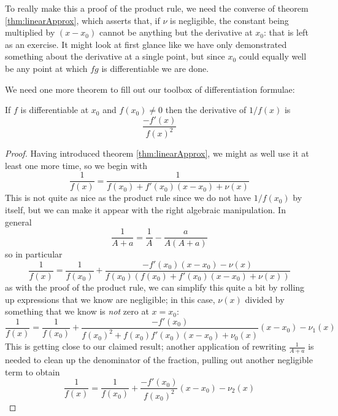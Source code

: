 To really make this a proof of the product rule, we need the converse of theorem \ref{thm:linearApprox}, which asserts that, if $\nu$ is negligible, the constant being multiplied by $(x-x_0)$ cannot be anything but the derivative at $x_0$: that is left as an exercise. It might look at first glance like we have only demonstrated something about the derivative at a single point, but since $x_0$ could equally well be any point at which $fg$ is differentiable we are done.

We need one more theorem to fill out our toolbox of differentiation formulae:

\begin{thm}\label{thm:multInverseDeriv}
If $f$ is differentiable at $x_0$ and $f(x_0) \neq 0$ then the derivative of $1/f(x)$ is
\[
\frac{-f'(x)}{f(x)^2}
\]
\end{thm}
\begin{proof}
Having introduced theorem \ref{thm:linearApprox}, we might as well use it at least one more time, so we begin with
\[
\frac{1}{f(x)} = \frac{1}{f(x_0) + f'(x_0)(x-x_0) + \nu(x)}
\]
This is not quite as nice as the product rule since we do not have $1/f(x_0)$ by itself, but we can make it appear with the right algebraic manipulation. In general
\[
\frac{1}{A + a} = \frac{1}{A} - \frac{a}{A(A+a)}
\]
so in particular
\[
\frac{1}{f(x)} = \frac{1}{f(x_0)} + \frac{-f'(x_0)(x-x_0)-\nu(x)}{f(x_0)(f(x_0)+f'(x_0)(x-x_0)+\nu(x))}
\]
as with the proof of the product rule, we can simplify this quite a bit by rolling up expressions that we know are negligible; in this case, $\nu(x)$ divided by something that we know is \emph{not} zero at $x=x_0$:
\[
\frac{1}{f(x)} = \frac{1}{f(x_0)}
+ \frac{-f'(x_0)}{f(x_0)^2+f(x_0)f'(x_0)(x-x_0)+\nu_0(x)}(x-x_0) - 
  \nu_1(x)
\]
This is getting close to our claimed result; another application of rewriting $\frac{1}{A+a}$ is needed to clean up the denominator of the fraction, pulling out another negligible term to obtain
\[
\frac{1}{f(x)} = \frac{1}{f(x_0)}
+ \frac{-f'(x_0)}{f(x_0)^2}(x-x_0) - \nu_2(x)
\]
\end{proof}


